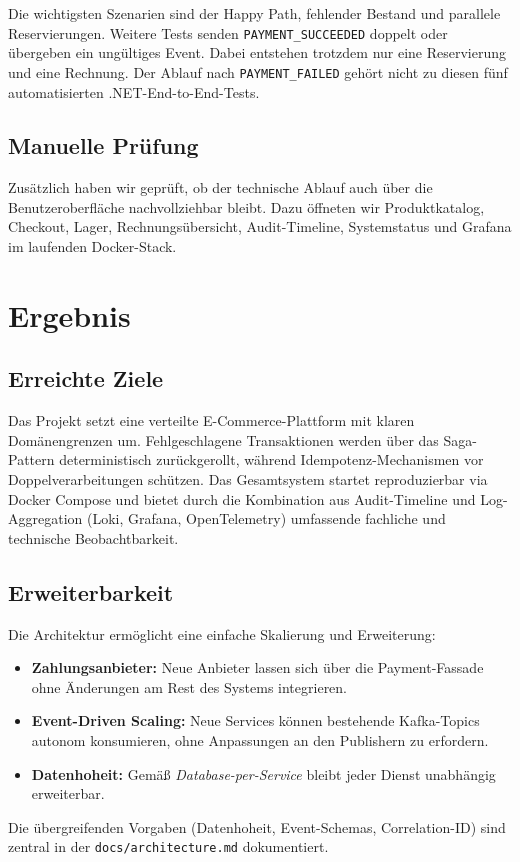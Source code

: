 \documentclass[
  11pt,
  a4paper,
  oneside,
  headings=normal,
  parskip=half,
  DIV=12
]{scrreprt}
\begin{document}
Die wichtigsten Szenarien sind der Happy Path, fehlender Bestand und parallele
Reservierungen. Weitere Tests senden \texttt{PAYMENT\_SUCCEEDED} doppelt oder
übergeben ein ungültiges Event. Dabei entstehen trotzdem nur eine Reservierung
und eine Rechnung. Der Ablauf nach \texttt{PAYMENT\_FAILED} gehört nicht zu
diesen fünf automatisierten .NET-End-to-End-Tests.

\section{Manuelle Prüfung}

Zusätzlich haben wir geprüft, ob der technische Ablauf auch über die
Benutzeroberfläche nachvollziehbar bleibt. Dazu öffneten wir Produktkatalog,
Checkout, Lager, Rechnungsübersicht, Audit-Timeline, Systemstatus und Grafana im
laufenden Docker-Stack.

\chapter{Ergebnis}

\section{Erreichte Ziele}

Das Projekt setzt eine verteilte E-Commerce-Plattform mit klaren Domänengrenzen um. Fehlgeschlagene Transaktionen werden über das Saga-Pattern deterministisch zurückgerollt, während Idempotenz-Mechanismen vor Doppelverarbeitungen schützen. Das Gesamtsystem startet reproduzierbar via Docker Compose und bietet durch die Kombination aus Audit-Timeline und Log-Aggregation (Loki, Grafana, OpenTelemetry) umfassende fachliche und technische Beobachtbarkeit.

\section{Erweiterbarkeit}

Die Architektur ermöglicht eine einfache Skalierung und Erweiterung:
\begin{itemize}
    \item \textbf{Zahlungsanbieter:} Neue Anbieter lassen sich über die Payment-Fassade ohne Änderungen am Rest des Systems integrieren.
    \item \textbf{Event-Driven Scaling:} Neue Services können bestehende Kafka-Topics autonom konsumieren, ohne Anpassungen an den Publishern zu erfordern.
    \item \textbf{Datenhoheit:} Gemäß \textit{Database-per-Service} bleibt jeder Dienst unabhängig erweiterbar.
\end{itemize}
Die übergreifenden Vorgaben (Datenhoheit, Event-Schemas, Correlation-ID) sind zentral in der \texttt{docs/architecture.md} dokumentiert.
\end{document}
